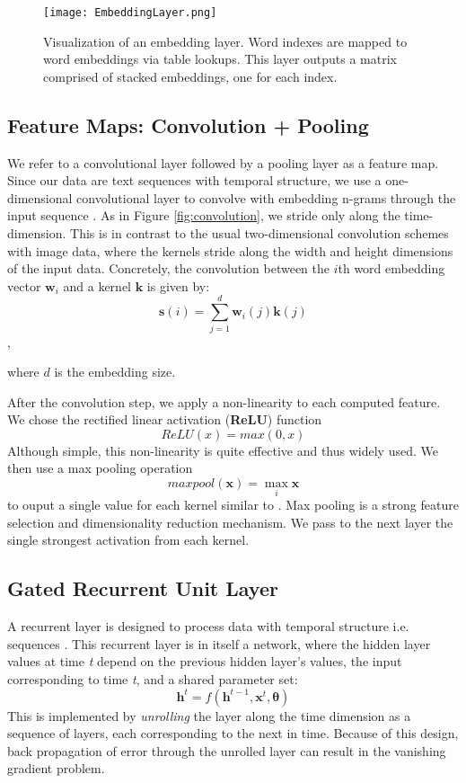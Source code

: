 \begin{figure}[H]
\centering
\texttt{[image: EmbeddingLayer.png]}
\caption{Visualization of an embedding layer. Word indexes are mapped to word embeddings via table lookups. This
layer outputs a matrix comprised of stacked embeddings, one for each index.}
\end{figure}

\subsection{Feature Maps: Convolution + Pooling}

We refer to a convolutional layer followed by a pooling layer as a feature map.
Since our data are text sequences with temporal structure, we use a one-dimensional convolutional
layer to convolve with embedding n-grams through the input sequence \cite{waibel1988phoneme}.
As in Figure \ref{fig:convolution}, we stride only along the time-dimension. This is in contrast to the usual two-dimensional convolution schemes with image data,
where the kernels stride along the width and height dimensions of the input data. Concretely, the convolution between the $i$th word embedding
vector $\bm{w}_i$ and a kernel $\bm{k}$ is given by:
\[\bm{s}(i) = \sum_{j=1}^{d}\bm{w}_i(j)\bm{k}(j)\],

where $d$ is the embedding size.

After the convolution step,
we apply a non-linearity to each computed feature. We chose the rectified linear activation (\textbf{ReLU}) function
\[ReLU(x) = max(0,x)\]
Although simple, this non-linearity is quite effective and thus widely used.
We then use a max pooling operation
\[maxpool(\bm{x}) = \max_i{ \bm{x} }\]
to ouput a single value for each kernel similar to \cite{DBLP:journals/corr/LinCY13}.
Max pooling is a strong feature selection and dimensionality reduction mechanism.
We pass to the next layer the single strongest activation from each kernel.

\subsection{Gated Recurrent Unit Layer}
A recurrent layer is designed to process data with temporal structure i.e. sequences \cite{rumelhart1986sequential}.
This recurrent layer is in itself a network, where the hidden layer values at time \textit{t} depend on the previous
hidden layer's values, the input corresponding to time \textit{t}, and a shared parameter set:
\[\bm{h}^{t} = f(\bm{h}^{t-1}, \bm{x}^{t}, \bm{\theta})\]
This is implemented by \textit{unrolling} the layer along the time dimension as a sequence of layers, each corresponding
to the next in time. Because of this design, back propagation of error through the unrolled layer can result
in the vanishing gradient problem.

